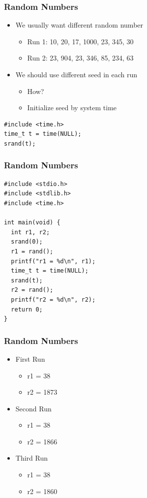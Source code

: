 \documentclass{../c-lecture}
\begin{document}
\begin{frame}[fragile]
  \frametitle{Random Numbers}
  \begin{itemize}
    \item We usually want different random number
    \begin{itemize}
      \item Run 1: 10, 20, 17, 1000, 23, 345, 30
      \item Run 2: 23, 904, 23, 346, 85, 234, 63
    \end{itemize}
    \item We should use different seed in each run
    \begin{itemize}
      \item How?
      \item Initialize seed by system time
    \end{itemize}
  \end{itemize}
  \begin{verbatim}
#include <time.h>
time_t t = time(NULL);
srand(t);
  \end{verbatim}
\end{frame}

\begin{frame}[fragile]
  \frametitle{Random Numbers}
  \begin{verbatim}
#include <stdio.h>
#include <stdlib.h>
#include <time.h>

int main(void) {
  int r1, r2;
  srand(0);
  r1 = rand();
  printf("r1 = %d\n", r1);
  time_t t = time(NULL);
  srand(t);
  r2 = rand();
  printf("r2 = %d\n", r2);
  return 0;
}
  \end{verbatim}
\end{frame}

\begin{frame}
  \frametitle{Random Numbers}
  \begin{itemize}
    \item First Run
    \begin{itemize}
      \item r1 = 38
      \item r2 = 1873
    \end{itemize}
    \item Second Run
    \begin{itemize}
      \item r1 = 38
      \item r2 = 1866
    \end{itemize}
    \item Third Run
    \begin{itemize}
      \item r1 = 38
      \item r2 = 1860
    \end{itemize}
  \end{itemize}
\end{frame}
\end{document}
